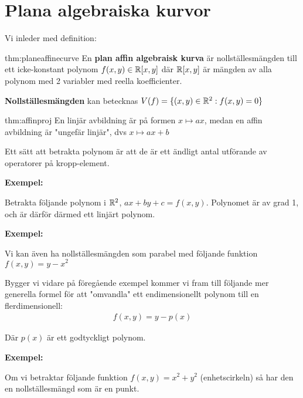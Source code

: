 \section{Plana algebraiska kurvor}
\par\bigskip
\noindent Vi inleder med definition:
\par\bigskip
\begin{theo}{thm:planeaffinecurve}
  En \textbf{plan affin algebraisk kurva} är nollställesmängden till ett icke-konstant polynom $f(x,y)\in\mathbb{R}[x,y]$ där $\mathbb{R}[x,y]$ är mängden av alla polynom med 2 variabler med reella koefficienter.
  \par\bigskip
  \noindent \textbf{Nollställesmängden} kan betecknas $V(f) = \{(x,y)\in\mathbb{R}^2:f(x,y)=0\}$ 
\end{theo}
\par\bigskip
\begin{theo}{thm:affinproj}
  En linjär avbildning är på formen $x\mapsto ax$, medan en affin avbildning är "ungefär linjär", dvs $x\mapsto ax+b$
\end{theo}
\par\bigskip
\noindent Ett sätt att betrakta polynom är att de är ett ändligt antal utförande av operatorer på kropp-element.
\par\bigskip
\noindent\textbf{Exempel:}\par
\noindent Betrakta följande polynom i $\mathbb{R}^2$, $ax+by+c = f(x,y)$. Polynomet är av grad 1, och är därför därmed ett linjärt polynom.
\par\bigskip
\noindent\textbf{Exempel:}\par
\noindent Vi kan även ha nollställesmängden som parabel med följande funktion $f(x,y) = y-x^2$ 
\par\bigskip
\noindent Bygger vi vidare på föregående exempel kommer vi fram till följande mer generella formel för att "omvandla" ett endimensionellt polynom till en flerdimensionell:
\begin{equation*}
  \begin{gathered}
    f(x,y) = y-p(x)
  \end{gathered}
\end{equation*}\par
\noindent Där $p(x)$ är ett godtyckligt polynom.
\par\bigskip
\noindent\textbf{Exempel:}\par
\noindent Om vi betraktar följande funktion $f(x,y) = x^2+y^2$ (enhetscirkeln) så har den en nollställesmängd som är en punkt.
